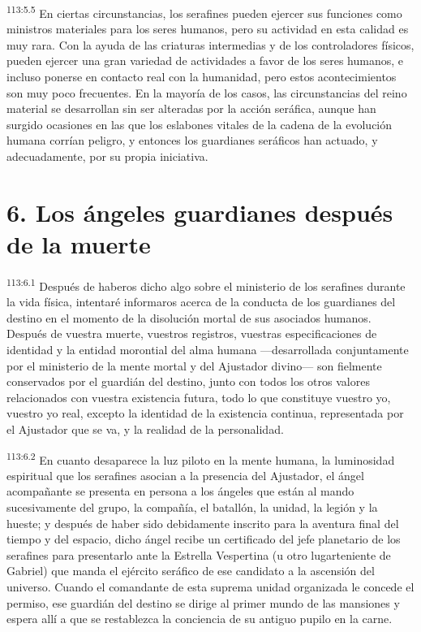 \documentclass[twoside, 11pt]{book}
\begin{document}
\par
\textsuperscript{113:5.5} En ciertas circunstancias, los serafines pueden ejercer sus funciones como ministros materiales para los seres humanos, pero su actividad en esta calidad es muy rara. Con la ayuda de las criaturas intermedias y de los controladores físicos, pueden ejercer una gran variedad de actividades a favor de los seres humanos, e incluso ponerse en contacto real con la humanidad, pero estos acontecimientos son muy poco frecuentes. En la mayoría de los casos, las circunstancias del reino material se desarrollan sin ser alteradas por la acción seráfica, aunque han surgido ocasiones en las que los eslabones vitales de la cadena de la evolución humana corrían peligro, y entonces los guardianes seráficos han actuado, y adecuadamente, por su propia iniciativa.

\section*{6. Los ángeles guardianes después de la muerte}
\par
\textsuperscript{113:6.1} Después de haberos dicho algo sobre el ministerio de los serafines durante la vida física, intentaré informaros acerca de la conducta de los guardianes del destino en el momento de la disolución mortal de sus asociados humanos. Después de vuestra muerte, vuestros registros, vuestras especificaciones de identidad y la entidad morontial del alma humana ---desarrollada conjuntamente por el ministerio de la mente mortal y del Ajustador divino--- son fielmente conservados por el guardián del destino, junto con todos los otros valores relacionados con vuestra existencia futura, todo lo que constituye vuestro yo, vuestro yo real, excepto la identidad de la existencia continua, representada por el Ajustador que se va, y la realidad de la personalidad.

\par
\textsuperscript{113:6.2} En cuanto desaparece la luz piloto en la mente humana, la luminosidad espiritual que los serafines asocian a la presencia del Ajustador, el ángel acompañante se presenta en persona a los ángeles que están al mando sucesivamente del grupo, la compañía, el batallón, la unidad, la legión y la hueste; y después de haber sido debidamente inscrito para la aventura final del tiempo y del espacio, dicho ángel recibe un certificado del jefe planetario de los serafines para presentarlo ante la Estrella Vespertina (u otro lugarteniente de Gabriel) que manda el ejército seráfico de ese candidato a la ascensión del universo. Cuando el comandante de esta suprema unidad organizada le concede el permiso, ese guardián del destino se dirige al primer mundo de las mansiones y espera allí a que se restablezca la conciencia de su antiguo pupilo en la carne.
\end{document}
